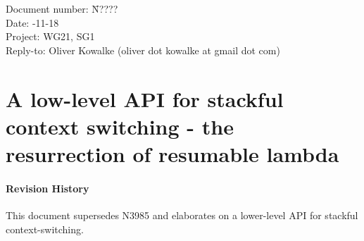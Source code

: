 \documentclass[a4paper,10pt,DIV15]{scrartcl}
\begin{document}
\small
\begin{tabbing}
    Document number: \= N????\\
    Date:            -11-18\\
    Project:         \> WG21, SG1\\
    Reply-to:        \> Oliver Kowalke (oliver dot kowalke at gmail dot com)\\
\end{tabbing}

\section*{A low-level API for stackful context switching - the resurrection of resumable lambda}


\tableofcontents


\paragraph*{Revision History}
This document supersedes N3985 and elaborates on a lower-level API for stackful
context-switching.












\end{document}
